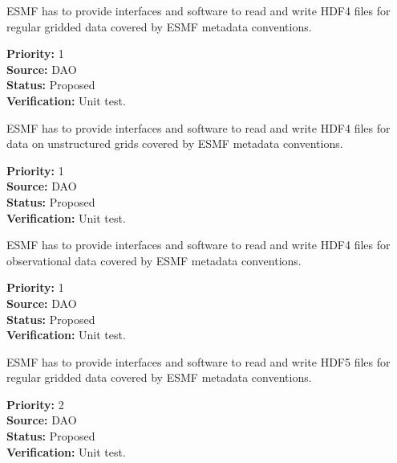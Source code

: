 
ESMF has to provide interfaces and software to read and write HDF4 files for 
regular gridded data covered by ESMF metadata conventions.
 

\begin{reqlist}
{\bf Priority:} 1 \\
{\bf Source:} DAO \\
{\bf Status:} Proposed \\
{\bf Verification:} Unit test. \\
\end{reqlist}




ESMF has to provide interfaces and software to read and write HDF4
files for data on unstructured grids covered by ESMF metadata conventions.
 

\begin{reqlist}
{\bf Priority:} 1 \\
{\bf Source:} DAO \\
{\bf Status:} Proposed \\
{\bf Verification:} Unit test. \\
\end{reqlist}




ESMF has to provide interfaces and software to read and write HDF4
files for observational data  covered by ESMF metadata conventions.
 

\begin{reqlist}
{\bf Priority:} 1 \\
{\bf Source:} DAO \\
{\bf Status:} Proposed \\
{\bf Verification:} Unit test. \\
\end{reqlist}





ESMF has to provide interfaces and software to read and write HDF5
files for regular gridded data covered by ESMF metadata conventions.

\begin{reqlist}
{\bf Priority:} 2 \\
{\bf Source:} DAO \\
{\bf Status:} Proposed \\
{\bf Verification:} Unit test. 
\end{reqlist}



